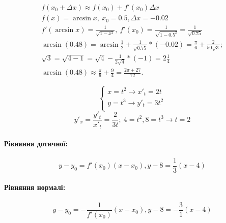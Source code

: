\documentclass[../rgr1.tex]{subfiles}
\begin{document}

\Solution

\begin{align}
f(x_0+\Delta x) \approx f(x_0) + f'(x_0)\Delta  x\\
	f(x) = \arcsin x,~
	x_0 = 0.5, \Delta x = -0.02 \\
	f'(\arcsin x) = \frac{1}{\sqrt{1 - x^2}},~
	f'(x_0) = \frac{1}{\sqrt{1 - 0.5^2}}
	= \frac{1}{\sqrt{0.75}} \\
	\arcsin(0.48) = \arcsin{\frac{1}{2}} + \frac{1}{\sqrt{0.75}} * (-0.02) =
	\frac{\pi}{6} + \frac{2}{50\sqrt{3}}; \\
	\sqrt{3} = \sqrt{4 - 1} = \sqrt{4} - \frac{1}{2\sqrt{4}} * (-1) =
	2\frac{1}{4} \\ %
	\arcsin(0.48) \approx \frac{\pi}{6} + \frac{9}{4} =
	\frac{2\pi + 27}{12}.
\end{align}



\Solution

\begin{equation}
\begin{cases}
	x = t^2 \to x'_t = 2t \\
	y = t^3 \to y'_t = 3t^2 \\
\end{cases}
\end{equation}
\begin{dmath}
	y'_x = \frac{y'_t}{x'_t} = \frac{2}{3t};~
	4 = t^2, 8 = t^3 \to t = 2
\end{dmath}

\paragraph{Рівняння дотичної:}
\begin{equation}
	y - y_0 = f'(x_0)(x - x_0),
	y - 8 = \frac{1}{3}(x - 4)
\end{equation}

\paragraph{Рівняння нормалі:}
\begin{equation}
	y - y_0 = -\frac{1}{f'(x_0)}(x - x_0),
	y - 8 = -\frac{3}{1}(x - 4)
\end{equation}

\end{document}
